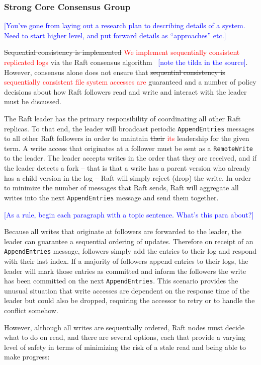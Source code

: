 \documentclass{article}
\newcommand{\pjk}[1]{{\bf
    [\marginpar[\hbox{{\textcolor{blue}{pjk}}\raisebox{0ex}{\Huge $\rightarrow$}}]%
{\hbox{\raisebox{0ex}{\Huge $\leftarrow$}{\textcolor{blue}{pjk}}}}\textcolor{blue}{#1}]}}
\renewcommand{\pjk}[1]{\textcolor{blue}{[#1]}}
\newcommand{\change}[2]{\sout{#1} \textcolor{red}{#2}}
\begin{document}
\subsubsection{Strong Core Consensus Group}

\pjk{You've gone from laying out a research plan to describing details of a system. Need to start higher level, and put forward details as ``approaches'' etc.}

\change{Sequential consistency is implemented}{We implement sequentially consistent replicated logs} via the Raft consensus algorithm~\cite{ongaro_search_2014} \pjk{note the tilda in the source}. However, consensus alone does not ensure that \change{sequential consistency is}{sequentially consistent file system accesses are} guaranteed and a number of policy decisions about how Raft followers read and write and interact with the leader must be discussed.

The Raft leader has the primary responsibility of coordinating all other Raft replicas. To that end, the leader will broadcast periodic \texttt{AppendEntries} messages to all other Raft followers in order to maintain \change{their}{its} leadership for the given term. A write access that originates at a follower must be sent as a \texttt{RemoteWrite} to the leader. The leader accepts writes in the order that they are received, and if the leader detects a fork -- that is that a write has a parent version who already has a child version in the log -- Raft will simply reject (drop) the write. In order to minimize the number of messages that Raft sends, Raft will aggregate all writes into the next \texttt{AppendEntries} message and send them together.

\pjk{As a rule, begin each paragraph with a topic sentence. What's this para about?}

Because all writes that originate at followers are forwarded to the leader, the leader can guarantee a sequential ordering of updates. Therefore on receipt of an \texttt{AppendEntries} message, followers simply add the entries to their log and respond with their last index. If a majority of followers append entries to their logs, the leader will mark those entries as committed and inform the followers the write has been committed on the next \texttt{AppendEntries}. This scenario provides the unusual situation that write accesses are dependent on the response time of the leader but could also be dropped, requiring the accessor to retry or to handle the conflict somehow.

However, although all writes are sequentially ordered, Raft nodes must decide what to do on read, and there are several options, each that provide a varying level of safety in terms of minimizing the risk of a stale read and being able to make progress:
\end{document}
